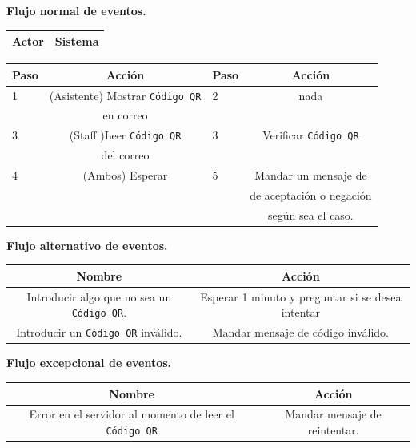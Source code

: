 \documentclass{article}
\newcommand{\newsubsection}[1]{
  \indent \textbf{#1}\\
}
\begin{document}
\newsubsection{Flujo normal de eventos.}
\begin{center}
  \begin{tabular}{| p{6.9cm} | p{6cm} |}
    \hline 
    Actor & Sistema \\\hline
  \end{tabular}
\end{center}

\begin{center}
  \begin{tabular}{| p{1mm} | c | p{1mm} | c |}
    \hline
    Paso & Acción & Paso & Acción \\\hline
    1 & (Asistente) Mostrar \texttt{Código QR}  & 2 & nada \\
    & en correo & & \\\hline
    3 & (Staff )Leer \texttt{Código QR} & 3 & Verificar
    \texttt{Código QR} \\
    & del correo & & \\\hline
    4 & (Ambos) Esperar & 5 & Mandar un mensaje de\\
    & & & de aceptación o negación \\
    & & & según sea el caso.\\\hline
  \end{tabular}
\end{center}

\newsubsection{Flujo alternativo de eventos.}
\begin{center}
  \begin{tabular}{| c | c |}
    \hline
    Nombre & Acción \\\hline
    Introducir algo que no sea un  \texttt{Código QR}. & Esperar 1 minuto y
    preguntar si se desea intentar\\\hline
    Introducir un \texttt{Código QR} inválido. & Mandar mensaje de código
    inválido. \\\hline
  \end{tabular}
\end{center}

\newsubsection{Flujo excepcional de eventos.}
\begin{center}
  \begin{tabular}{| c | c |}
    \hline
    Nombre & Acción \\\hline
    Error en el servidor al momento de leer el \texttt{Código QR} & Mandar
    mensaje de reintentar. \\\hline
  \end{tabular}
\end{center}
\end{document}
